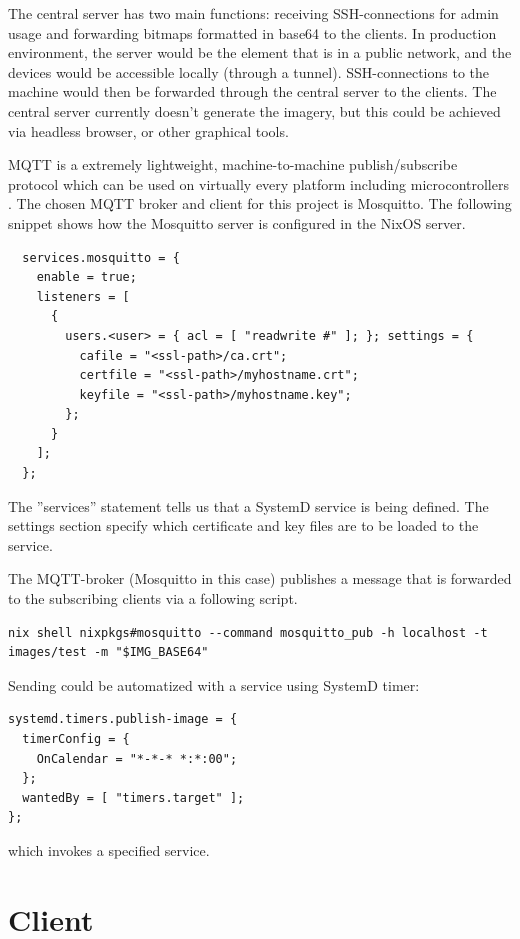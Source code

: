 The central server has two main functions: receiving SSH-connections
for admin usage and forwarding bitmaps formatted in base64 to the
clients. In production environment, the server would be the element
that is in a public network, and the devices would be accessible
locally (through a tunnel). SSH-connections to the machine would then
be forwarded through the central server to the clients. The central
server currently doesn't generate the imagery, but this could be
achieved via headless browser, or other graphical tools.

MQTT is a extremely lightweight, machine-to-machine publish/subscribe
protocol which can be used on virtually every platform including
microcontrollers \cite{oasisopenMQTTVersion}. The chosen MQTT broker
and client for this project is Mosquitto. The following snippet shows
how the Mosquitto server is configured in the NixOS server.

\begin{lstlisting}
  services.mosquitto = {
    enable = true;
    listeners = [
      {
        users.<user> = { acl = [ "readwrite #" ]; }; settings = {
          cafile = "<ssl-path>/ca.crt";
          certfile = "<ssl-path>/myhostname.crt";
          keyfile = "<ssl-path>/myhostname.key";
        };
      }
    ];
  };
\end{lstlisting}

The ''services'' statement tells us that a SystemD service is being
defined. The settings section specify which certificate and key files
are to be loaded to the service.

The MQTT-broker (Mosquitto in this case) publishes a message that is
forwarded to the subscribing clients via a following script.

\begin{lstlisting}
nix shell nixpkgs#mosquitto --command mosquitto_pub -h localhost -t
images/test -m "$IMG_BASE64"
\end{lstlisting}

Sending could be automatized with a service using SystemD timer:
\begin{lstlisting}
systemd.timers.publish-image = {
  timerConfig = {
    OnCalendar = "*-*-* *:*:00";
  };
  wantedBy = [ "timers.target" ];
};
\end{lstlisting}

which invokes a specified service.

\section{Client}

